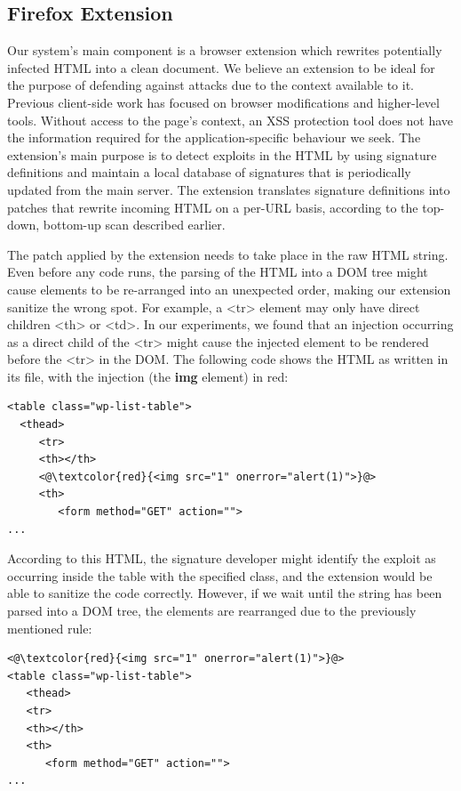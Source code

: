  \subsection{Firefox Extension} \label{firefox_extension}
 Our system's main component is a browser extension which rewrites potentially infected HTML into a clean document. We believe an extension to be ideal for the purpose of defending against attacks due to the context available to it. Previous client-side work has focused on browser modifications and higher-level tools. Without access to the page's context, an XSS protection tool does not have the information required for the application-specific behaviour we seek. The extension's main purpose is to detect exploits in the HTML by using signature definitions and maintain a local database of signatures that is periodically updated from the main server. The extension translates signature definitions into patches that rewrite incoming HTML on a per-URL basis, according to the top-down, bottom-up scan described earlier. 

The patch applied by the extension needs to take place in the raw HTML string. Even before any code runs, the parsing of the HTML into a DOM tree might cause elements to be re-arranged into an unexpected order, making our extension sanitize the wrong spot. For example, a <tr> element may only have direct children <th> or <td>. In our experiments, we found that an injection occurring as a direct child of the <tr> might cause the injected element to be rendered before the <tr> in the DOM. The following code shows the HTML as written in its file, with the injection (the \textbf{img} element) in red:

\begin{lstlisting}
<table class="wp-list-table">
  <thead>
     <tr>
     <th></th>
     <@\textcolor{red}{<img src="1" onerror="alert(1)">}@>
     <th>
   	    <form method="GET" action="">
...
\end{lstlisting}

According to this HTML, the signature developer might identify the exploit as occurring inside the table with the specified class, and the extension would be able to sanitize the code correctly. However, if we wait until the string has been parsed into a DOM tree, the elements are rearranged due to the previously mentioned rule:

\begin{lstlisting}
<@\textcolor{red}{<img src="1" onerror="alert(1)">}@>
<table class="wp-list-table">
   <thead>
   <tr>
   <th></th>
   <th>
      <form method="GET" action="">
...
\end{lstlisting}

